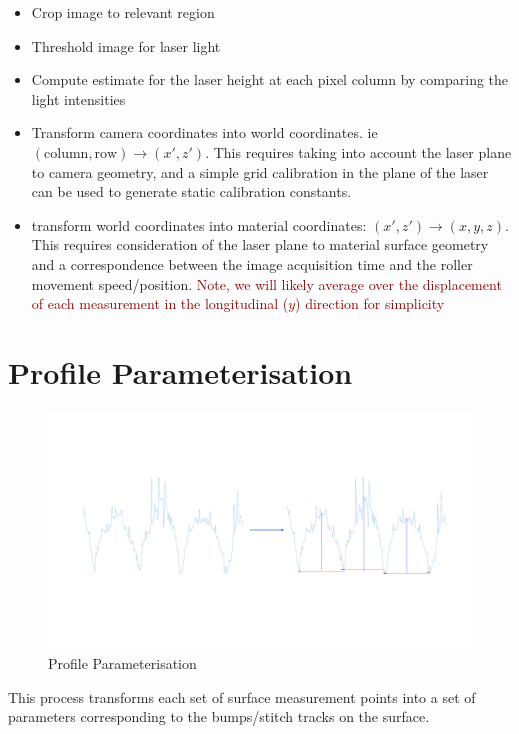 \documentclass[12pt]{report}
\newcommand{\tcr}[1]{\textcolor{darkRed}{#1}}
\begin{document}
        \begin{itemize}
            \item Crop image to relevant region
            \item Threshold image for laser light
            \item Compute estimate for the laser height at each pixel column by comparing the light intensities
            \item Transform camera coordinates into world coordinates.
            ie $(\text{column}, \text{row}) \rightarrow (x',z')$. This requires taking into account the laser plane to camera geometry, and a simple grid calibration in the plane of the laser can be used to generate static calibration constants.
            \item transform world coordinates into material coordinates: $(x',z') \rightarrow (x,y,z)$. This requires consideration of the laser plane to material surface geometry and a correspondence between the image acquisition time and the roller movement speed/position. \tcr{Note, we will likely average over the displacement of each measurement in the longitudinal ($y$) direction for simplicity}
        \end{itemize}
    
    \section{Profile Parameterisation}
        \begin{figure}
            \centering
            \includegraphics[width=\textwidth,trim={0 5cm 0 5cm},clip]{figures/profile_measure/temp_parameterise.pdf}
            \caption{Profile Parameterisation}
        \end{figure}
        This process transforms each set of surface measurement points into a set of parameters corresponding to the bumps/stitch tracks on the surface.
        
\end{document}
